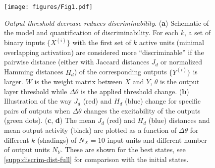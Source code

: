 
\begin{figure}[ht]
    \centering
    \texttt{[image: figures/Fig1.pdf]}
    \caption{
    \textit{Output threshold decrease reduces discriminability}.
    (\textbf{a}) Schematic of the model and quantification of discriminability.
        For each $k$, a set of binary inputs $\{X^{(i)}\}$ with the first set of $k$ active units
            (minimal overlapping activation) are considered more ``discriminable''
        if the pairwise distance (either with Jaccard distances $J_d$ or normalized Hamming distances $H_d$)
            of the corresponding outputs $\{Y^{(i)}\}$ is larger.
        $W$ is the weight matrix between $X$ and $Y$, $\theta$ is the output layer threshold
            while $\Delta \theta$ is the applied threshold change.
    (\textbf{b}) Illustration of the way $J_d$ (red) and $H_d$ (blue) change for specific pairs of outputs
        when $\Delta \theta$ changes the excitability of the outputs (green dots).
    (\textbf{c}, \textbf{d}) The mean $J_d$ (red) and $H_d$ (blue) distances and mean output activity (black) are plotted
        as a function of $\Delta \theta$ for different $k$ (shadings)
        of $N_X = 10$ input units and different number of output units $N_Y$.
    These are shown for the best states, see \autoref{supp:discrim-dist-full} for comparison with the initial states.
    }
    \label{fig:discrim}
\end{figure}